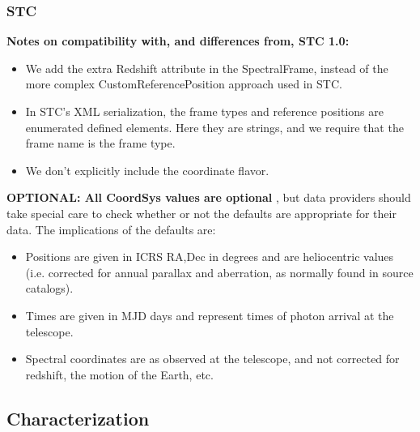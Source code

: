 \documentclass[11pt]{article}
\begin{document}
\subsubsection{STC}
 
 {\bf Notes on compatibility with, and differences from, STC 1.0:  } 
\begin{itemize}
\item We add the extra Redshift attribute in the SpectralFrame, instead of the
more complex CustomReferencePosition approach used in STC.
\item In STC's XML serialization, the frame types and reference positions are enumerated
defined elements. Here they are strings, and we require that the frame name is the frame type.
\item We don't explicitly include the coordinate flavor.
\end{itemize}

 
{\bf OPTIONAL: All CoordSys values are optional } , but data providers
should take special care to check whether or not the defaults are appropriate for
their data. The implications of the defaults are:
\begin{itemize}
\item Positions are given in ICRS RA,Dec in degrees and are 
heliocentric values (i.e. corrected for annual parallax and aberration,
as normally found in source catalogs).
\item Times are given in MJD days and represent times of photon arrival
at the telescope.
\item Spectral coordinates are as observed at the telescope, and
not corrected for redshift, the motion of the Earth, etc.
\end{itemize}

 
 


\clearpage


 

\subsection{Characterization}
\end{document}
